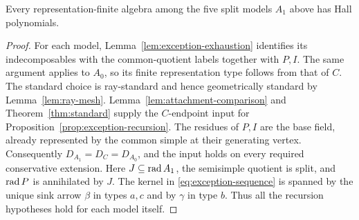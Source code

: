 \begin{corollary}\label{cor:attachments}
Every representation-finite algebra among the five split models $A_1$ above has Hall polynomials.
\end{corollary}
\begin{proof}
For each model, Lemma~\ref{lem:exception-exhaustion} identifies its indecomposables with the common-quotient labels together with $P,I$. The same argument applies to $A_0$, so its finite representation type follows from that of $C$. The standard choice is ray-standard and hence geometrically standard by Lemma~\ref{lem:ray-mesh}. Lemma~\ref{lem:attachment-comparison} and Theorem~\ref{thm:standard} supply the $C$-endpoint input for Proposition~\ref{prop:exception-recursion}. The residues of $P,I$ are the base field, already represented by the common simple at their generating vertex. Consequently $D_{A_1}=D_C=D_{A_0}$, and the input holds on every required conservative extension. Here $J\subseteq\operatorname{rad} A_1$, the semisimple quotient is split, and $\operatorname{rad} P$ is annihilated by $J$. The kernel in \eqref{eq:exception-sequence} is spanned by the unique sink arrow $\beta$ in types $a,c$ and by $\gamma$ in type $b$. Thus all the recursion hypotheses hold for each model itself.
\end{proof}
